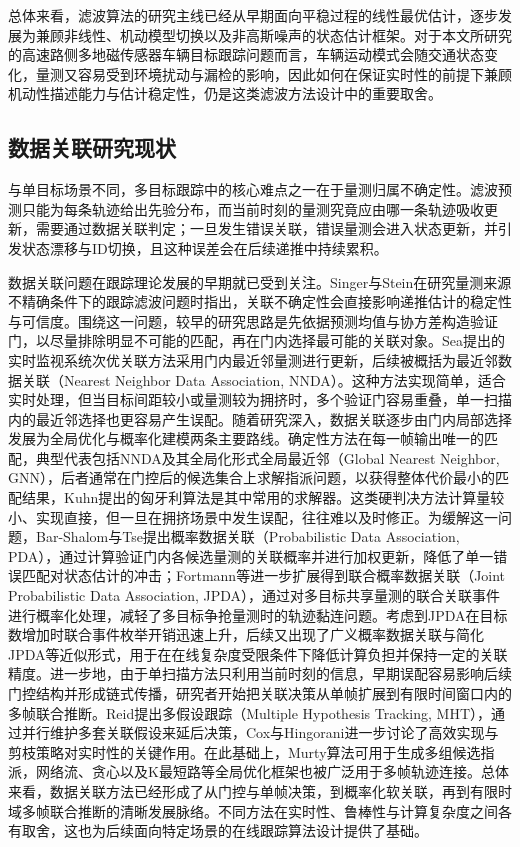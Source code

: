 \documentclass{xdupgthesis}
\begin{document}
总体来看，滤波算法的研究主线已经从早期面向平稳过程的线性最优估计，逐步发展为兼顾非线性、机动模型切换以及非高斯噪声的状态估计框架。对于本文所研究的高速路侧多地磁传感器车辆目标跟踪问题而言，车辆运动模式会随交通状态变化，量测又容易受到环境扰动与漏检的影响，因此如何在保证实时性的前提下兼顾机动性描述能力与估计稳定性，仍是这类滤波方法设计中的重要取舍。

\subsection{数据关联研究现状}
与单目标场景不同，多目标跟踪中的核心难点之一在于量测归属不确定性。滤波预测只能为每条轨迹给出先验分布，而当前时刻的量测究竟应由哪一条轨迹吸收更新，需要通过数据关联判定；一旦发生错误关联，错误量测会进入状态更新，并引发状态漂移与ID切换，且这种误差会在后续递推中持续累积\cite{barshalomli1995multitarget}。

数据关联问题在跟踪理论发展的早期就已受到关注。Singer与Stein在研究量测来源不精确条件下的跟踪滤波问题时指出，关联不确定性会直接影响递推估计的稳定性与可信度\cite{singer1971optimaltracking}。围绕这一问题，较早的研究思路是先依据预测均值与协方差构造验证门，以尽量排除明显不可能的匹配，再在门内选择最可能的关联对象。Sea提出的实时监视系统次优关联方法采用门内最近邻量测进行更新，后续被概括为最近邻数据关联（Nearest Neighbor Data Association, NNDA）\cite{sea1971suboptimal}。这种方法实现简单，适合实时处理，但当目标间距较小或量测较为拥挤时，多个验证门容易重叠，单一扫描内的最近邻选择也更容易产生误配。随着研究深入，数据关联逐步由门内局部选择发展为全局优化与概率化建模两条主要路线。确定性方法在每一帧输出唯一的匹配，典型代表包括NNDA及其全局化形式全局最近邻（Global Nearest Neighbor, GNN），后者通常在门控后的候选集合上求解指派问题，以获得整体代价最小的匹配结果，Kuhn提出的匈牙利算法是其中常用的求解器\cite{kuhn1955hungarian}。这类硬判决方法计算量较小、实现直接，但一旦在拥挤场景中发生误配，往往难以及时修正。为缓解这一问题，Bar-Shalom与Tse提出概率数据关联（Probabilistic Data Association, PDA），通过计算验证门内各候选量测的关联概率并进行加权更新，降低了单一错误匹配对状态估计的冲击\cite{barshalom1975pda}；Fortmann等进一步扩展得到联合概率数据关联（Joint Probabilistic Data Association, JPDA），通过对多目标共享量测的联合关联事件进行概率化处理，减轻了多目标争抢量测时的轨迹黏连问题\cite{fortmann1983jpda}。考虑到JPDA在目标数增加时联合事件枚举开销迅速上升，后续又出现了广义概率数据关联与简化JPDA等近似形式，用于在在线复杂度受限条件下降低计算负担并保持一定的关联精度\cite{pan2005gpda,qin2005simplifiedjpda,sheng2020simplifiedjpda}。进一步地，由于单扫描方法只利用当前时刻的信息，早期误配容易影响后续门控结构并形成链式传播，研究者开始把关联决策从单帧扩展到有限时间窗口内的多帧联合推断。Reid提出多假设跟踪（Multiple Hypothesis Tracking, MHT），通过并行维护多套关联假设来延后决策\cite{reid1979mht}，Cox与Hingorani进一步讨论了高效实现与剪枝策略对实时性的关键作用\cite{cox1996efficientmht}。在此基础上，Murty算法可用于生成多组候选指派\cite{murty1968ranking}，网络流、贪心以及K最短路等全局优化框架也被广泛用于多帧轨迹连接\cite{zhang2008networkflow,pirsiavash2011greedy,berclaz2011kshortest}。总体来看，数据关联方法已经形成了从门控与单帧决策，到概率化软关联，再到有限时域多帧联合推断的清晰发展脉络。不同方法在实时性、鲁棒性与计算复杂度之间各有取舍，这也为后续面向特定场景的在线跟踪算法设计提供了基础。
\end{document}

